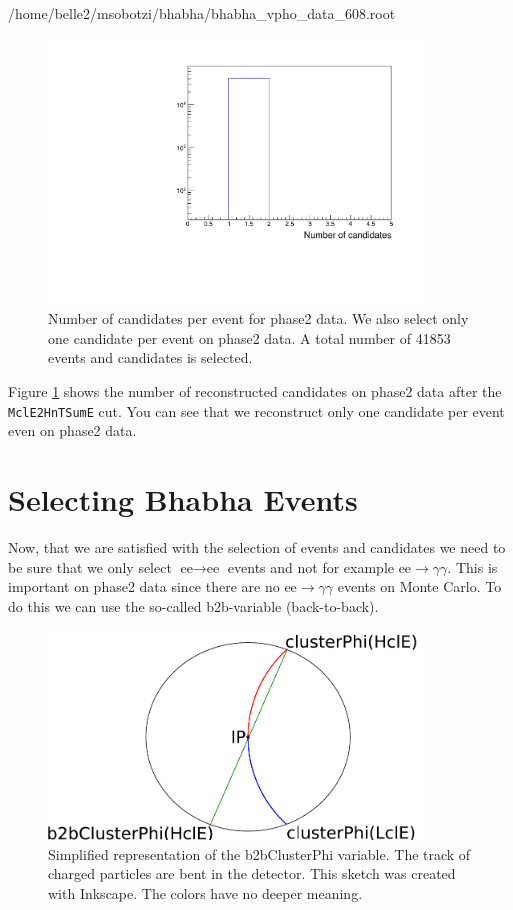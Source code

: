 \documentclass[a4paper,11pt,twosided,final,german,openbib,pdftex,listof=totoc,bibliography=totoc]{scrbook}
\begin{document}
/home/belle2/msobotzi/bhabha/bhabha\_vpho\_data\_608.root
\newline

\begin{figure}[h!]
	\centering
	\includegraphics[width=10cm]{Cuts/Data/nCandData.pdf}
	\caption[Number Of Candidates Per Event for Phase2 Data (All Cuts)]{Number of candidates per event for phase2 data. We also select only one candidate per event on phase2 data. A total number of 41853 events and candidates is selected.}
	\label{fig:nCandData}
\end{figure}

Figure \ref{fig:nCandData} shows the number of reconstructed candidates on phase2 data after the \texttt{MclE2HnTSumE} cut. You can see that we reconstruct only one candidate per event even on phase2 data.



\section{Selecting Bhabha Events}
\label{sec:SelectingElectronPositron}

Now, that we are satisfied with the selection of events and candidates we need to be sure that we only select $\textrm{ee} \rightarrow \textrm{ee}$ events and not for example $\textrm{ee} \rightarrow \gamma \gamma$. This is important on phase2 data since there are no $\textrm{ee} \rightarrow \gamma \gamma$ events on Monte Carlo. To do this we can use the so-called b2b-variable (back-to-back).

\begin{figure}[h!]
	\centering
	\includegraphics[width=10cm]{Bilder/b2b_2}
	\caption[Sketch Of The b2bClusterPhi Variable]{Simplified representation of the b2bClusterPhi variable. The track of charged particles are bent in the detector. This sketch was created with Inkscape. The colors have no deeper meaning.}
	\label{fig:Sketchb2b}
\end{figure}
\end{document}
